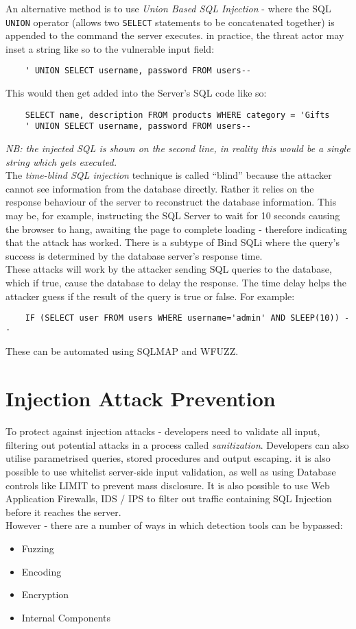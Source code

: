 An alternative method is to use \textit{Union Based SQL Injection} - where the SQL \verb|UNION| operator (allows two \verb|SELECT| statements to be concatenated together) is appended to the command the server executes. in practice, the threat actor may inset a string like so to the vulnerable input field:
\begin{verbatim}
    ' UNION SELECT username, password FROM users--
\end{verbatim}
This would then get added into the Server's SQL code like so:
\begin{verbatim}
    SELECT name, description FROM products WHERE category = 'Gifts
    ' UNION SELECT username, password FROM users--
\end{verbatim}
\textit{NB: the injected SQL is shown on the second line, in reality this would be a single string which gets executed.}\\

The \textit{time-blind SQL injection} technique is called ``blind'' because the attacker cannot see information from the database directly. Rather it relies on the response behaviour of the server to reconstruct the database information. This may be, for example, instructing the SQL Server to wait for 10 seconds causing the browser to hang, awaiting the page to complete loading - therefore indicating that the attack has worked. There is a subtype of Bind SQLi where the query's success is determined by the database server's response time.\\

These attacks will work by the attacker sending SQL queries to the database, which if true, cause the database to delay the response. The time delay helps the attacker guess if the result of the query is true or false. For example:
\begin{verbatim}
    IF (SELECT user FROM users WHERE username='admin' AND SLEEP(10)) --
\end{verbatim}
These can be automated using SQLMAP and WFUZZ. 

\section{Injection Attack Prevention}
To protect against injection attacks - developers need to validate all input, filtering out potential attacks in a process called \textit{sanitization}. Developers can also utilise parametrised queries, stored procedures and output escaping. it is also possible to use whitelist server-side input validation, as well as using Database controls like LIMIT to prevent mass disclosure. It is also possible to use Web Application Firewalls, IDS / IPS to filter out traffic containing SQL Injection before it reaches the server. \\

However - there are a number of ways in which detection tools can be bypassed:
\begin{itemize}
    \item Fuzzing
    \item Encoding
    \item Encryption
    \item Internal Components
\end{itemize}